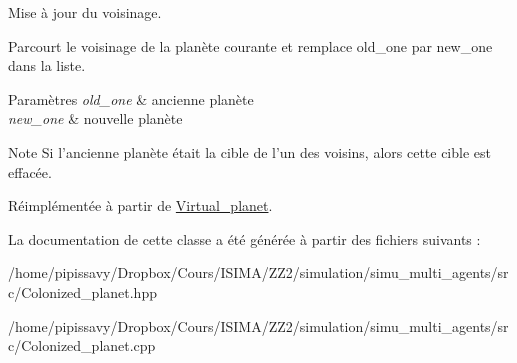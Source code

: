 Mise à jour du voisinage. 

Parcourt le voisinage de la planète courante et remplace old\-\_\-one par new\-\_\-one dans la liste.


\begin{DoxyParams}{Paramètres}
{\em old\-\_\-one} & ancienne planète \\
\hline
{\em new\-\_\-one} & nouvelle planète\\
\hline
\end{DoxyParams}
\begin{DoxyNote}{Note}
Si l'ancienne planète était la cible de l'un des voisins, alors cette cible est effacée. 
\end{DoxyNote}


Réimplémentée à partir de \hyperlink{classVirtual__planet}{Virtual\-\_\-planet}.



La documentation de cette classe a été générée à partir des fichiers suivants \-:\begin{DoxyCompactItemize}
\item 
/home/pipissavy/\-Dropbox/\-Cours/\-I\-S\-I\-M\-A/\-Z\-Z2/simulation/simu\-\_\-multi\-\_\-agents/src/Colonized\-\_\-planet.\-hpp\item 
/home/pipissavy/\-Dropbox/\-Cours/\-I\-S\-I\-M\-A/\-Z\-Z2/simulation/simu\-\_\-multi\-\_\-agents/src/Colonized\-\_\-planet.\-cpp\end{DoxyCompactItemize}
